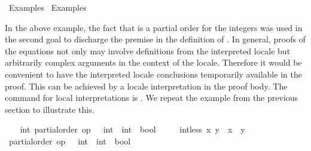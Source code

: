 %
\begin{isabellebody}%
\def\isabellecontext{Examples{\isadigit{3}}}%
%
\isadelimtheory
%
\endisadelimtheory
%
\isatagtheory
{}\isamarkupfalse%
\ Examples{}\isanewline
{}\ Examples\isanewline
{}%
\endisatagtheory
{\isafoldtheory}%
%
\isadelimtheory
%
\endisadelimtheory
%
\begin{isamarkuptext}%
\vspace{-5ex}%
\end{isamarkuptext}%
\isamarkuptrue%
%
\isamarkuptrue%
%
\begin{isamarkuptext}%
In the above example, the fact that  is a partial
  order for the integers was used in the second goal to
  discharge the premise in the definition of .  In
  general, proofs of the equations not only may involve definitions
  from the interpreted locale but arbitrarily complex arguments in the
  context of the locale.  Therefore it would be convenient to have the
  interpreted locale conclusions temporarily available in the proof.
  This can be achieved by a locale interpretation in the proof body.
  The command for local interpretations is .  We
  repeat the example from the previous section to illustrate this.%
\end{isamarkuptext}%
\isamarkuptrue%
%
\isadelimvisible
\ \ %
\endisadelimvisible
%
\isatagvisible
{}\isamarkupfalse%
\ int{}\ partial{}order\ {}op\ {}\ {}{}\ int\ {}\ int\ {}\ bool{}\isanewline
\ \ \ \ \ {}int{}less\ x\ y\ {}\ {}x\ {}\ y{}{}\isanewline
\ \ \isamarkupfalse%
\ {}\isanewline
\ \ \ \ \isamarkupfalse%
\ {}partial{}order\ {}op\ {}\ {}{}\ int\ {}\ int\ {}\ bool{}{}\isanewline

\end{isabellebody}
